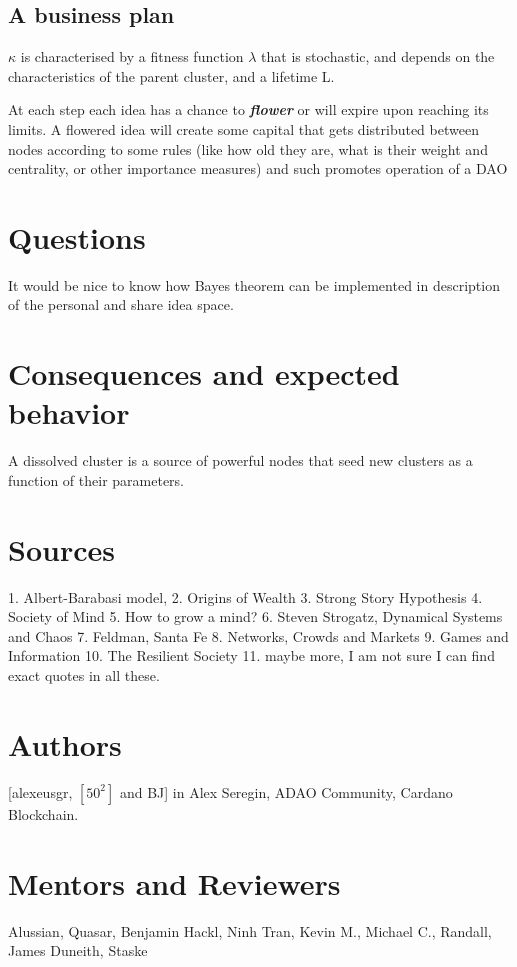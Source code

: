 \documentclass{article}
\begin{document}
\subsection{A business plan}
$\kappa$ is characterised by a fitness function $\lambda$ that is stochastic, and depends on the characteristics of the parent cluster, and a lifetime L.

At each step each idea has a chance to \textbf{\textit{flower}} or will expire upon reaching its limits.
A flowered idea will create some capital that gets distributed between nodes according to some rules (like how old they are, what is their weight and centrality, or other importance measures) and such promotes operation of a DAO

\section{Questions}
It would be nice to know how Bayes theorem can be implemented in description of the personal and share idea space.

\section{Consequences and expected behavior}
A dissolved cluster is a source of powerful nodes that seed new clusters as a function of their parameters.

\section{Sources}
1. Albert-Barabasi model, 
2. Origins of Wealth
3. Strong Story Hypothesis
4. Society of Mind
5. How to grow a mind?
6. Steven Strogatz, Dynamical Systems and Chaos
7. Feldman, Santa Fe
8. Networks, Crowds and Markets
9. Games and Information
10. The Resilient Society
11. maybe more, I am not sure I can find exact quotes in all these. 
\section{Authors}
[alexeusgr, $[50^2]$ and BJ] in Alex Seregin, ADAO Community, Cardano Blockchain. 
\section{Mentors and Reviewers}
Alussian, Quasar, Benjamin Hackl, Ninh Tran, Kevin M., Michael C., Randall, James Duneith, Staske 
\end{document}
